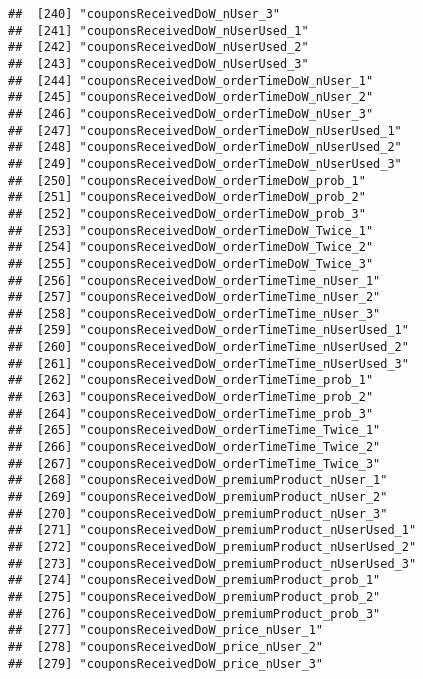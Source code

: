 \documentclass[10pt]{report}
\begin{document}
\begin{verbatim}
##  [240] "couponsReceivedDoW_nUser_3"                           
##  [241] "couponsReceivedDoW_nUserUsed_1"                       
##  [242] "couponsReceivedDoW_nUserUsed_2"                       
##  [243] "couponsReceivedDoW_nUserUsed_3"                       
##  [244] "couponsReceivedDoW_orderTimeDoW_nUser_1"              
##  [245] "couponsReceivedDoW_orderTimeDoW_nUser_2"              
##  [246] "couponsReceivedDoW_orderTimeDoW_nUser_3"              
##  [247] "couponsReceivedDoW_orderTimeDoW_nUserUsed_1"          
##  [248] "couponsReceivedDoW_orderTimeDoW_nUserUsed_2"          
##  [249] "couponsReceivedDoW_orderTimeDoW_nUserUsed_3"          
##  [250] "couponsReceivedDoW_orderTimeDoW_prob_1"               
##  [251] "couponsReceivedDoW_orderTimeDoW_prob_2"               
##  [252] "couponsReceivedDoW_orderTimeDoW_prob_3"               
##  [253] "couponsReceivedDoW_orderTimeDoW_Twice_1"              
##  [254] "couponsReceivedDoW_orderTimeDoW_Twice_2"              
##  [255] "couponsReceivedDoW_orderTimeDoW_Twice_3"              
##  [256] "couponsReceivedDoW_orderTimeTime_nUser_1"             
##  [257] "couponsReceivedDoW_orderTimeTime_nUser_2"             
##  [258] "couponsReceivedDoW_orderTimeTime_nUser_3"             
##  [259] "couponsReceivedDoW_orderTimeTime_nUserUsed_1"         
##  [260] "couponsReceivedDoW_orderTimeTime_nUserUsed_2"         
##  [261] "couponsReceivedDoW_orderTimeTime_nUserUsed_3"         
##  [262] "couponsReceivedDoW_orderTimeTime_prob_1"              
##  [263] "couponsReceivedDoW_orderTimeTime_prob_2"              
##  [264] "couponsReceivedDoW_orderTimeTime_prob_3"              
##  [265] "couponsReceivedDoW_orderTimeTime_Twice_1"             
##  [266] "couponsReceivedDoW_orderTimeTime_Twice_2"             
##  [267] "couponsReceivedDoW_orderTimeTime_Twice_3"             
##  [268] "couponsReceivedDoW_premiumProduct_nUser_1"            
##  [269] "couponsReceivedDoW_premiumProduct_nUser_2"            
##  [270] "couponsReceivedDoW_premiumProduct_nUser_3"            
##  [271] "couponsReceivedDoW_premiumProduct_nUserUsed_1"        
##  [272] "couponsReceivedDoW_premiumProduct_nUserUsed_2"        
##  [273] "couponsReceivedDoW_premiumProduct_nUserUsed_3"        
##  [274] "couponsReceivedDoW_premiumProduct_prob_1"             
##  [275] "couponsReceivedDoW_premiumProduct_prob_2"             
##  [276] "couponsReceivedDoW_premiumProduct_prob_3"             
##  [277] "couponsReceivedDoW_price_nUser_1"                     
##  [278] "couponsReceivedDoW_price_nUser_2"                     
##  [279] "couponsReceivedDoW_price_nUser_3"                     

\end{verbatim}
\end{document}
